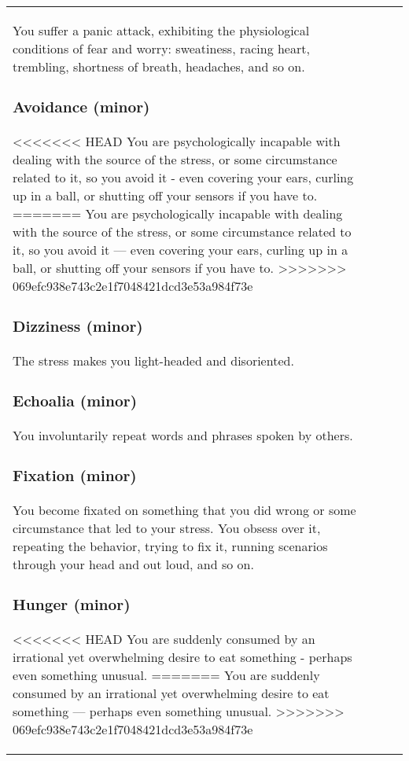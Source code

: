 \begin{table}
\begin{tabular}{|p{8cm}|r|r|r|}
You suffer a panic attack, exhibiting the physiological conditions of fear and worry: sweatiness, racing heart, trembling, shortness of breath, headaches, and so on. 

\subsubsection{Avoidance (minor)} 

<<<<<<< HEAD You are psychologically incapable with dealing with the source of the stress, or some circumstance related to it, so you avoid it - even covering your ears, curling up in a ball, or shutting off your sensors if you have to. ======= You are psychologically incapable with dealing with the source of the stress, or some circumstance related to it, so you avoid it --- even covering your ears, curling up in a ball, or shutting off your sensors if you have to. >>>>>>> 069efc938e743c2e1f7048421dcd3e53a984f73e 

\subsubsection{Dizziness (minor)} 

The stress makes you light-headed and disoriented. 

\subsubsection{Echoalia (minor)} 

You involuntarily repeat words and phrases spoken by others. 

\subsubsection{Fixation (minor)} 

You become fixated on something that you did wrong or some circumstance that led to your stress. You obsess over it, repeating the behavior, trying to fix it, running scenarios through your head and out loud, and so on. 

\subsubsection{Hunger (minor)} 

<<<<<<< HEAD You are suddenly consumed by an irrational yet overwhelming desire to eat something - perhaps even something unusual. ======= You are suddenly consumed by an irrational yet overwhelming desire to eat something --- perhaps even something unusual. >>>>>>> 069efc938e743c2e1f7048421dcd3e53a984f73e 


\end{tabular}
\end{table}
